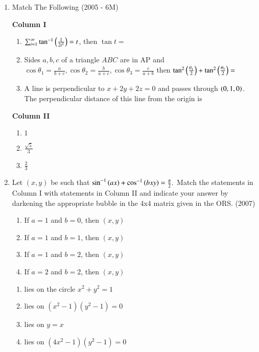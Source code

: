 \documentclass[journal,12pt,twocolumn]{IEEEtran}
\theoremstyle{remark}
\begin{document}
\begin{enumerate}
	\item{
		Match The Following \hfill (2005 - 6M)
		\begin{multicols}{2}
			\textbf{Column I}\\
			\begin{enumerate}
				\item{$\sum_{i=1}^{\infty}\tan^{-1}\left(\frac{1}{2i^2}\right)=t$, then $\tan t =$}
				\item{Sides $a,b,c$ of a triangle $ABC$ are in AP and $\cos\theta_1=\frac{a}{b+c}, \cos\theta_2=\frac{b}{a+c}, \cos\theta_3=\frac{c}{a+b}$ then $\tan^2\left(\frac{\theta_1}{2}\right)+\tan^2\left(\frac{\theta_3}{2}\right) = $}
				\item{A line is perpendicular to $x+2y+2z=0$ and passes through $\left(0,1,0\right)$. The perpendicular distance of this line from the origin is}
			\end{enumerate}
			\columnbreak
			\textbf{Column II}\\
			\begin{enumerate}
				\item{$1$}
				\item{$\frac{\sqrt{5}}{3}$}
				\item{$\frac{2}{3}$}
			\end{enumerate}
		\end{multicols}}
	\item{
		Let $(x,y)$ be such that $\sin^{-1}\left(ax\right)+\cos^{-1}\left(bxy\right)=\frac{\pi}{2}.\\$
		Match the statements in Column I with statements in Column II and indicate your answer by darkening the appropriate bubble in the 4x4 matrix given in the ORS. \hfill (2007)
		\begin{multicols}{2}
			\begin{enumerate}
				\item{If $a=1$ and $b=0$, then $(x, y)$}
				\item{If $a=1$ and $b=1$, then $(x, y)$}
				\item{If $a=1$ and $b=2$, then $(x, y)$}
				\item{If $a=2$ and $b=2$, then $(x, y)$}
			\end{enumerate}
			\columnbreak
			\begin{enumerate}
				\item{lies on the circle $x^2 + y^2 = 1$}
				\item{lies on $(x^2-1)(y^2-1)=0$}
				\item{lies on $y=x$}
				\item{lies on $(4x^2-1)(y^2-1)=0$}
			\end{enumerate}
		\end{multicols}}
	

\end{enumerate}
\end{document}
